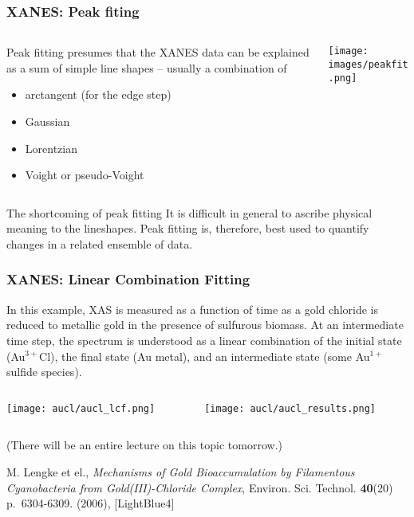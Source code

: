 \documentclass[10pt, xcolor=x11names, compress]{beamer}
\begin{document}
\begin{frame}
  \frametitle{XANES: Peak fiting}
  \begin{columns}
    \begin{column}{0.5\linewidth}
      Peak fitting presumes that the XANES data can be explained as a
      sum of simple line shapes -- usually a combination of
      \begin{itemize}
      \item arctangent (for the edge step)
      \item Gaussian
      \item Lorentzian
      \item Voight or pseudo-Voight
      \end{itemize}
    \end{column}
    \begin{column}{0.5\linewidth}
      \texttt{[image: images/peakfit.png]}
    \end{column}
  \end{columns}

  \bigskip

  \begin{block}{The shortcoming of peak fitting}
    It is difficult in general to ascribe physical meaning to the
    lineshapes.  Peak fitting is, therefore, best used to quantify
    changes in a related ensemble of data.
  \end{block}
\end{frame}

\begin{frame}
  \frametitle{XANES: Linear Combination Fitting}
  In this example, XAS is measured as a function of time as a gold
  chloride is reduced to metallic gold in the presence of sulfurous
  biomass.  At an intermediate time step, the spectrum is understood
  as a linear combination of the initial state
  ({\color{Green4}Au$^{3+}$Cl}), the final state ({\color{Purple4}Au
    metal}), and an intermediate state ({\color{Orange2}some Au$^{1+}$
    sulfide species}).
  \begin{columns}
    \begin{column}{0.5\linewidth}
      \texttt{[image: aucl/aucl\_lcf.png]}
    \end{column}
    \begin{column}{0.5\linewidth}
      \texttt{[image: aucl/aucl\_results.png]}
    \end{column}
  \end{columns}
  \begin{flushright}
    \scriptsize (There will be an entire lecture on this topic tomorrow.)
  \end{flushright}
  \begin{bottomnote}[0.5][18.75]
    M. Lengke et el., \textit{Mechanisms of Gold Bioaccumulation by
      Filamentous Cyanobacteria from Gold(III)-Chloride Complex},
    Environ. Sci. Technol. \textbf{40}(20) p.~6304-6309. (2006),
    [LightBlue4]
  \end{bottomnote}
\end{frame}
\end{document}

